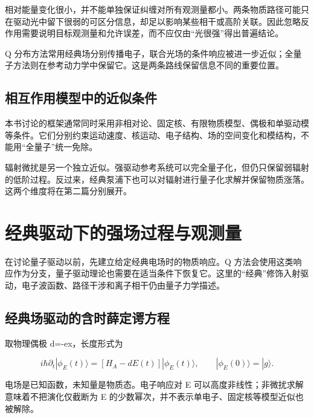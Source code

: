 \documentclass[UTF8,a4paper,zihao=-4,openany,fontset=fandol]{ctexbook}
\begin{document}
相对能量变化很小，并不能单独保证纠缠对所有观测量都小。两条物质路径可能只在驱动光中留下很弱的可区分信息，却足以影响某些相干或高阶关联。因此忽略反作用需要说明目标观测量和允许误差，而不应仅由“光很强”得出普遍结论。



Q 分布方法常用经典场分别传播电子，联合光场的条件响应被进一步近似；全量子方法则在参考动力学中保留它。这是两条路线保留信息不同的重要位置。



\section{相互作用模型中的近似条件}\label{sec:03:10}


本书讨论的框架通常同时采用非相对论、固定核、有限物质模型、偶极和单驱动模等条件。它们分别约束运动速度、核运动、电子结构、场的空间变化和模结构，不能用“全量子”统一免除。



辐射微扰是另一个独立近似。强驱动参考系统可以完全量子化，但仍只保留弱辐射的低阶过程。反过来，经典泵浦下也可以对辐射进行量子化求解并保留物质涨落。这两个维度将在第二篇分别展开。



\chapter{经典驱动下的强场过程与观测量}\label{ch:04}


在讨论量子驱动以前，先建立给定经典电场时的物质响应。Q 方法会使用这类响应作为分支，量子驱动理论也需要在适当条件下恢复它。这里的“经典”修饰入射驱动，电子波函数、路径干涉和离子相干仍由量子力学描述。



\section{经典场驱动的含时薛定谔方程}\label{sec:04:1}


取物理偶极 d=-ex，长度形式为



\begin{equation*}
i\hbar\partial_t|\phi_E(t)\rangle
=[H_A-dE(t)]|\phi_E(t)\rangle,\qquad
|\phi_E(0)\rangle=|g\rangle.
\tag{4.1}\label{eq:4.1}
\end{equation*}


电场是已知函数，未知量是物质态。电子响应对 E 可以高度非线性；非微扰求解意味着不把演化仅截断为 E 的少数幂次，并不表示单电子、固定核等模型近似也被解除。
\end{document}
